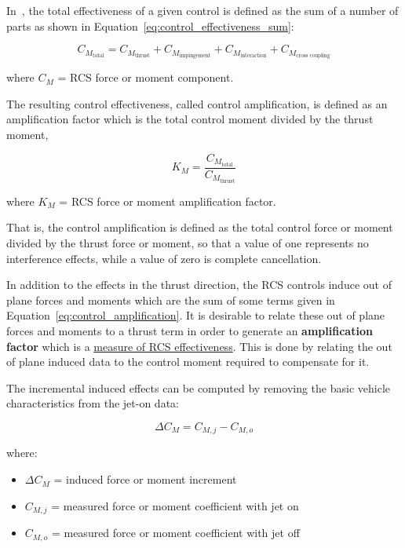 \documentclass[12pt]{article}
\begin{document}
In~\cite{rausch1973rcs,rausch1975space,rausch1975reaction,rausch1977space,rausch1978space,kanipe1983plume}, the total effectiveness of a given control is defined as the sum of a number of parts as shown in Equation~\ref{eq:control_effectiveness_sum}:

\begin{equation}
    C_{M_{\text{total}}} = C_{M_{\text{thrust}}} + C_{M_{\text{impingement}}} + C_{M_{\text{interaction}}} + C_{M_{\text{cross coupling}}}
    \label{eq:control_effectiveness_sum}
\end{equation}

where $C_M$ = RCS force or moment component.

The resulting control effectiveness, called control amplification, is defined as an amplification factor which is the total control moment divided by the thrust moment,

\begin{equation}
    K_M = \frac{C_{M_{\text{total}}}}{C_{M_{\text{thrust}}}}
    \label{eq:control_amplification}
\end{equation}

where $K_M$ = RCS force or moment amplification factor.

That is, the control amplification is defined as the total control force or moment divided by the thrust force or moment, so that a value of one represents no interference effects, while a value of zero is complete cancellation.

In addition to the effects in the thrust direction, the RCS controls induce out of plane
forces and moments which are the sum of some terms given in Equation~\ref{eq:control_amplification}.  It is desirable to relate these out of plane forces and moments to a thrust term in order to generate an \textbf{amplification factor} which is a \ul{measure of RCS effectiveness}. This is done by relating the out of plane induced data to the control moment required to compensate for it. 

The incremental induced effects can be computed by removing the basic vehicle characteristics from the jet-on data:

\begin{equation}
    \Delta C_M = C_{M,j} - C_{M,o}
\end{equation}

where:

\begin{itemize}
    \item $\Delta C_M$ = induced force or moment increment
    \item $C_{M,j}$ = measured force or moment coefficient with jet on
    \item $C_{M,o}$ = measured force or moment coefficient with jet off
\end{itemize}
\end{document}
